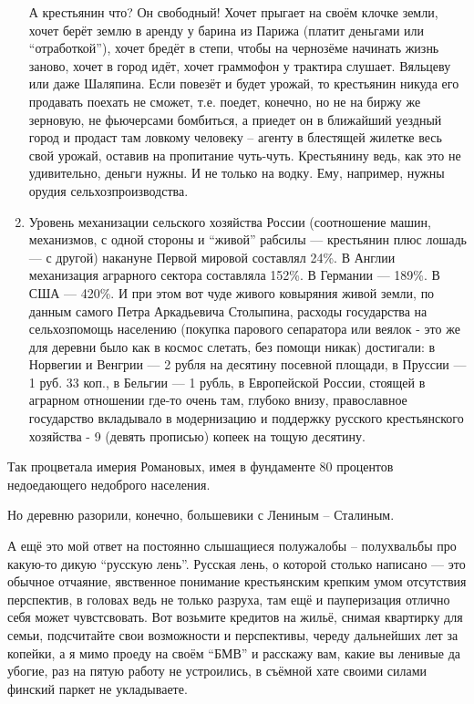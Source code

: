 \begin{enumerate}
А крестьянин что? Он свободный! Хочет прыгает на своём клочке земли, хочет берёт
землю в аренду у барина из Парижа (платит деньгами или \enquote{отработкой}),
хочет бредёт в степи, чтобы на чернозёме начинать жизнь заново, хочет в город
идёт, хочет граммофон у трактира слушает. Вяльцеву или даже Шаляпина. Если
повезёт и будет урожай, то крестьянин никуда его продавать поехать не сможет,
т.е. поедет, конечно, но не на биржу же зерновую, не фьючерсами бомбиться, а
приедет он в ближайший уездный город и продаст там ловкому человеку -- агенту в
блестящей жилетке весь свой урожай, оставив на пропитание чуть-чуть. Крестьянину
ведь, как это не удивительно, деньги нужны. И не только на водку. Ему, например,
нужны орудия сельхозпроизводства.
\item Уровень механизации сельского хозяйства России (соотношение машин,
механизмов, с одной стороны и \enquote{живой} рабсилы --- крестьянин плюс лошадь
--- с другой) накануне Первой мировой составлял 24\%. В Англии механизация
аграрного сектора составляла 152\%. В Германии --- 189\%. В США --- 420\%. И при
этом вот чуде живого ковыряния живой земли, по данным самого Петра Аркадьевича
Столыпина, расходы государства на сельхозпомощь населению (покупка парового
сепаратора или веялок - это же для деревни было как в космос слетать, без помощи
никак) достигали: в Норвегии и Венгрии --- 2 рубля на десятину посевной площади,
в Пруссии --- 1 руб. 33 коп., в Бельгии --- 1 рубль, в Европейской России,
стоящей в аграрном отношении где-то очень там, глубоко внизу, православное
государство вкладывало в модернизацию и поддержку русского крестьянского
хозяйства - 9 (девять прописью) копеек на тощую десятину.
\end{enumerate}

Так процветала имерия Романовых, имея в фундаменте 80 процентов недоедающего
недоброго населения.

Но деревню разорили, конечно, большевики с Лениным -- Сталиным.

А ещё это мой ответ на постоянно слышащиеся полужалобы -- полухвальбы про
какую-то дикую \enquote{русскую лень}. Русская лень, о которой столько
написано --- это обычное отчаяние, явственное понимание крестьянским крепким
умом отсутствия перспектив, в головах ведь не только разруха, там ещё и
пауперизация отлично себя может чувстсвовать. Вот возьмите кредитов на жильё,
снимая квартирку для семьи, подсчитайте свои возможности и перспективы, череду
дальнейших лет за копейки, а я мимо проеду на своём \enquote{БМВ} и расскажу
вам, какие вы ленивые да убогие, раз на пятую работу не устроились, в съёмной
хате своими силами финский паркет не укладываете.
